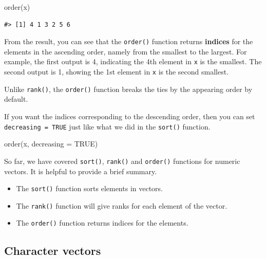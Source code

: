 \documentclass[
]{book}
\newenvironment{Shaded}{\begin{snugshade}}{\end{snugshade}}
\newcommand{\AttributeTok}[1]{\textcolor[rgb]{0.77,0.63,0.00}{#1}}
\newcommand{\ConstantTok}[1]{\textcolor[rgb]{0.00,0.00,0.00}{#1}}
\newcommand{\FunctionTok}[1]{\textcolor[rgb]{0.00,0.00,0.00}{#1}}
\newcommand{\NormalTok}[1]{#1}
\providecommand{\tightlist}{%
  \setlength{\itemsep}{0pt}\setlength{\parskip}{0pt}}
\newenvironment{infobox}[1]
  {
  \begin{itemize}
  \renewcommand{\labelitemi}{
    \raisebox{-.7\height}[0pt][0pt]{
      {\setkeys{Gin}{width=3em,keepaspectratio}
        \texttt{[image: pics/\#1]}}
    }
  }
  \setlength{\fboxsep}{1em}
  \begin{blackbox}
  \item
  }
  {
  \end{blackbox}
  \end{itemize}
  }
\newenvironment{blackbox}{
  \definecolor{shadecolor}{rgb}{0, 0, 0}  %
  \color{white}
  \begin{shaded}}
 {\end{shaded}}
\begin{document}
\begin{Shaded}
\begin{Highlighting}[]
\FunctionTok{order}\NormalTok{(x)}
\end{Highlighting}
\end{Shaded}

\begin{verbatim}
#> [1] 4 1 3 2 5 6
\end{verbatim}

From the result, you can see that the \texttt{order()} function returns \textbf{indices} for the elements in the ascending order, namely from the smallest to the largest. For example, the first output is 4, indicating the 4th element in \texttt{x} is the smallest. The second output is 1, showing the 1st element in \texttt{x} is the second smallest.

\begin{infobox}{caution}
Unlike \texttt{rank()}, the \texttt{order()} function breaks the ties by the appearing order by default.

\end{infobox}

If you want the indices corresponding to the descending order, then you can set \texttt{decreasing\ =\ TRUE} just like what we did in the \texttt{sort()} function.

\begin{Shaded}
\begin{Highlighting}[]
\FunctionTok{order}\NormalTok{(x, }\AttributeTok{decreasing =} \ConstantTok{TRUE}\NormalTok{)  }
\end{Highlighting}
\end{Shaded}

So far, we have covered \texttt{sort()}, \texttt{rank()} and \texttt{order()} functions for numeric vectors. It is helpful to provide a brief summary.

\begin{itemize}
\tightlist
\item
  The \texttt{sort()} function sorts elements in vectors.
\item
  The \texttt{rank()} function will give ranks for each element of the vector.
\item
  The \texttt{order()} function returns indices for the elements.
\end{itemize}

\hypertarget{character-vectors}{%
\subsection{Character vectors}\label{character-vectors}}
\end{document}
